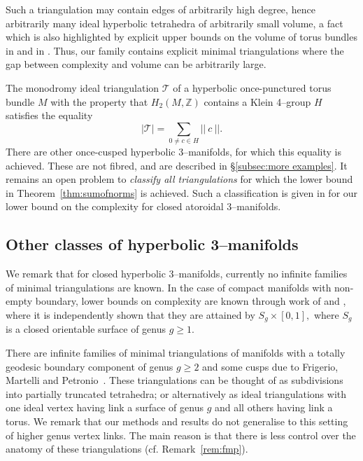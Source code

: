 \documentclass[a4paper]{gtart}
\def\tri{\mathcal{T}}
\def\manifold{M}
\def\Z{\mathbb{Z}}
\theoremstyle{plain}
\theoremstyle{definition}
\theoremstyle{remark}
\numberwithin{equation}{section}
\begin{document}
Such a triangulation may contain edges of arbitrarily high degree, hence arbitrarily many ideal hyperbolic tetrahedra of arbitrarily small volume, a fact which is also highlighted by explicit upper bounds on the volume of torus bundles in \cite[Theorem B.1]{Gueritaud-canonical-2006} and in \cite[Corollary 2.4]{Agol03SmallLargeGenus}. Thus, our family contains explicit minimal triangulations where the gap between complexity and volume can be arbitrarily large. 

The monodromy ideal triangulation $\tri$ of a hyperbolic once-punctured torus bundle $\manifold$ with the property that $H_2(\manifold,\Z)$ contains a Klein 4--group $H$ satisfies the equality
$$|\tri| = \sum \limits_{0 \neq c \in H} || \ c\ ||.$$
There are other once-cusped hyperbolic 3--manifolds, for which this equality is achieved. These are not fibred, and are described in \S\ref{subsec:more examples}.
It remains an open problem to \emph{classify all triangulations} for which the lower bound in Theorem~\ref{thm:sumofnorms} is achieved. Such a classification is given in \cite{Jaco-Z2-2017} for our lower bound on the complexity for closed atoroidal 3--manifolds.

\subsection{Other classes of hyperbolic 3--manifolds}

We remark that for closed hyperbolic 3--manifolds, currently no infinite families of minimal triangulations are known. In the case of compact manifolds with non-empty boundary, lower bounds on complexity are known through work of \cite{Bucher-simplicial-2015} and \cite{Jaco-bounds-2016}, where it is independently shown that they are attained by $S_g\times[0,1],$ where $S_g$ is a closed orientable surface of genus $g\ge 1.$

There are infinite families of minimal triangulations of manifolds with a totally geodesic boundary component of genus $g\ge 2$ and some cusps due to Frigerio, Martelli and Petronio~\cite{Frigerio-Dehn-2003}. These triangulations can be thought of as subdivisions into partially truncated tetrahedra; or alternatively as ideal triangulations with one ideal vertex having link a surface of genus $g$ and all others having link a torus. We remark that our methods and results do not generalise to this setting of higher genus vertex links. The main reason is that there is less control over the anatomy of these triangulations (cf. Remark~\ref{rem:fmp}).
\end{document}
